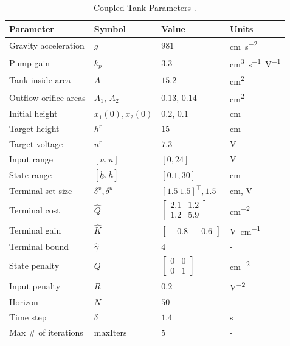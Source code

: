 \documentclass[a4paper, 10 pt, conference]{IEEEconf}
\begin{document}
\begin{table}[ht]
\centering
\def\strut{\rule{0pt}{7.5pt}}
\caption{Coupled Tank Parameters \cite{Quanser}.}
\label{tab:param}
\begin{tabular}{@{}llll@{\strut}}
\hline
\textbf{Parameter} & \textbf{Symbol} & \textbf{Value} & \textbf{Units} \\ \hline
Gravity acceleration     &    $g$    &   $981$    &    \si{cm.s^{-2}}   \\ \hline
Pump gain &   $k_p$     &    $3.3$   &    \si{cm^3 s^{-1} V^{-1}}   \\ \hline
Tank inside area &   $A$     &    $15.2$   &    \si{cm^2}   \\ \hline
Outflow orifice areas &   $A_1$, $A_2$     &    $0.13$, $0.14$   &    \si{cm^2}   \\ \hline
Initial height &   $x_1(0), x_2(0)$     &    $0.2$, $0.1$   &    \si{cm} \\ \hline
Target height &   $h^r$   &    $15$   &  \si{cm}  \\ \hline
Target voltage &   $u^r$   &    $7.3$   &  \si{V}  \\ \hline
Input range &   $[\underline{u}, \overline{u}]$   &   $\left[0, 24\right]$   &    \si{V}  \\ \hline
State range &   $[\underline{h}, \overline{h}]$   &   $\left[0.1, 30 \right]$   &    \si{cm}  \\ \hline
Terminal set size &   $\delta^x, \delta^u$   &   $[1.5 \ 1.5]^\top, 1.5$   &   \si{cm}, \si{V}  \\ \hline
Terminal cost &   $\hat{Q}$   &   $\begin{bmatrix} 2.1  & 1.2\\ 1.2  & 5.9 \end{bmatrix}$   &  \si{cm^{-2}}  \\ \hline
Terminal gain &   $\hat{K}$   &   $\begin{bmatrix} -0.8 & -0.6\end{bmatrix}$   &  \si{V cm^{-1}}  \\ \hline
Terminal bound &   $\hat{\gamma}$   &   $4$   &  \si{-}  \\ \hline
State penalty &   $Q$   &   $\begin{bmatrix} 0  & 0\\ 0  & 1 \end{bmatrix}$   &    \si{cm^{-2}}  \\ \hline
Input penalty &   $R$   &   $0.2$   &    \si{V^{-2}}  \\ \hline
Horizon &   $N$   &   $50$   &    \si{-}  \\ \hline
Time step &   $\delta$   &   $1.4$   &    \si{s}  \\ \hline
Max \# of iterations &   $\text{maxIters}$   &   $5$   &    \si{-}  \\ \hline
\end{tabular}
\vspace{-3mm}
\end{table}
\end{document}
